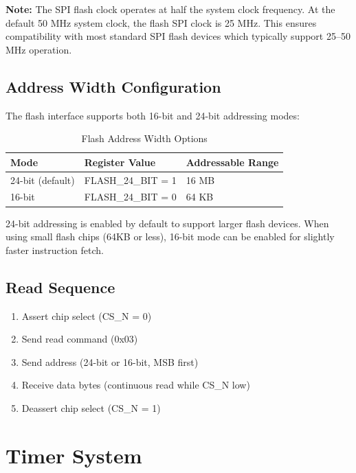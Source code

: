 \documentclass[11pt,a4paper]{article}
\begin{document}
\textbf{Note:} The SPI flash clock operates at half the system clock frequency. At the default 50 MHz system clock, the flash SPI clock is 25 MHz. This ensures compatibility with most standard SPI flash devices which typically support 25--50 MHz operation.

\subsection{Address Width Configuration}

The flash interface supports both 16-bit and 24-bit addressing modes:

\begin{table}[H]
\centering
\caption{Flash Address Width Options}
\begin{tabular}{@{}lll@{}}
\toprule
\textbf{Mode} & \textbf{Register Value} & \textbf{Addressable Range} \\
\midrule
24-bit (default) & FLASH\_24\_BIT = 1 & 16 MB \\
16-bit & FLASH\_24\_BIT = 0 & 64 KB \\
\bottomrule
\end{tabular}
\end{table}

24-bit addressing is enabled by default to support larger flash devices. When using small flash chips (64KB or less), 16-bit mode can be enabled for slightly faster instruction fetch.

\subsection{Read Sequence}

\begin{enumerate}[noitemsep]
    \item Assert chip select (CS\_N = 0)
    \item Send read command (0x03)
    \item Send address (24-bit or 16-bit, MSB first)
    \item Receive data bytes (continuous read while CS\_N low)
    \item Deassert chip select (CS\_N = 1)
\end{enumerate}

\section{Timer System}
\end{document}
